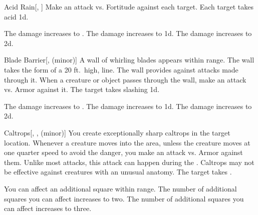 \lowercase{\hypertarget{spell:Acid Rain}{}}\label{spell:Acid Rain}
\begin{freeability}[Rank 2]{\hypertarget{spell:Acid Rain}{Acid Rain}}[, ]
Make an attack vs. Fortitude against each target.
\hit Each target takes acid  \minus1d.

\rankline
{} The damage increases to .
 The damage increases to  \plus1d.
 The damage increases to  \plus2d.
\end{freeability}
\vspace{0.25em}



\lowercase{\hypertarget{spell:Blade Barrier}{}}\label{spell:Blade Barrier}
\begin{freeability}[Rank 2]{\hypertarget{spell:Blade Barrier}{Blade Barrier}}[,  (minor)]
A wall of whirling blades appears within \rngmed range.
The wall takes the form of a 20 ft.\ high, \arealarge line.
The wall provides  against attacks made through it.
When a creature or object passes through the wall, make an attack vs. Armor against it.
\hit The target takes slashing  \minus1d.

\rankline
{} The damage increases to .
 The damage increases to  \plus1d.
 The damage increases to  \plus2d.
\end{freeability}
\vspace{0.25em}



\lowercase{\hypertarget{spell:Caltrops}{}}\label{spell:Caltrops}
\begin{freeability}[Rank 2]{\hypertarget{spell:Caltrops}{Caltrops}}[, ,  (minor)]
You create exceptionally sharp caltrops in the target location.
Whenever a creature moves into the area, unless the creature moves at one quarter speed to avoid the danger, you make an attack vs. Armor against them.
Unlike most attacks, this attack can happen during the .
Caltrops may not be effective against creatures with an unusual anatomy.
\hit The target takes .

\rankline
{} You can affect an additional square within range.
 The number of additional squares you can affect increases to two.
 The number of additional squares you can affect increases to three.
\end{freeability}
\vspace{0.25em}



